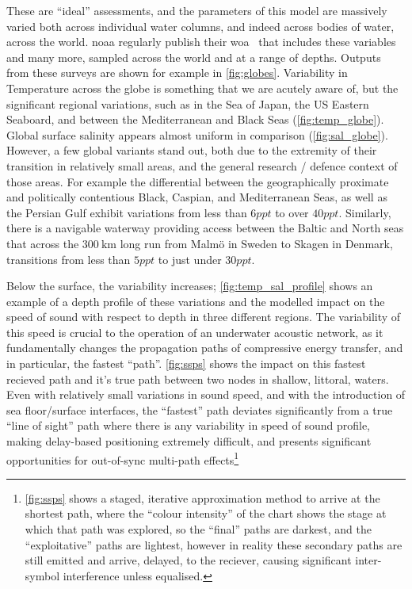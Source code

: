 These are ``ideal'' assessments, and the parameters of this model are massively varied both across individual water columns, and indeed across bodies of water, across the world. 
\gls{noaa} regularly publish their \gls{woa}~\cite{Locarnini2013,Zweng2013} that includes these variables and many more, sampled across the world and at a range of depths. 
Outputs from these surveys are shown for example in \autoref{fig:globes}. 
Variability in Temperature across the globe is something that we are acutely aware of, but the significant regional variations, such as in the Sea of Japan, the US Eastern Seaboard, and between the Mediterranean and Black Seas (\autoref{fig:temp_globe}).
Global surface salinity appears almost uniform in comparison (\autoref{fig:sal_globe}).
However, a few global variants stand out, both due to the extremity of their transition in relatively small areas, and the general research / defence context of those areas. 
For example the differential between the geographically proximate and politically contentious Black, Caspian, and Mediterranean Seas, as well as the Persian Gulf exhibit variations from less than $6ppt$ to over $40ppt$.
Similarly, there is a navigable waterway providing access between the Baltic and North seas that across the $\SI{300}{\kilo\meter}$ long run from Malm{\"o} in Sweden to Skagen in Denmark, transitions from less than $5ppt$ to just under $30ppt$. 

Below the surface, the variability increases; \autoref{fig:temp_sal_profile} shows an example of a depth profile of these variations and the modelled impact on the speed of sound with respect to depth in three different regions. 
The variability of this speed is crucial to the operation of an underwater acoustic network, as it fundamentally changes the propagation paths of compressive energy transfer, and in particular, the fastest ``path''. 
\autoref{fig:ssps} shows the impact on this fastest recieved path and it's true path between two nodes in shallow, littoral, waters.
Even with relatively small variations in sound speed, and with the introduction of sea floor/surface interfaces, the ``fastest'' path deviates significantly from a true ``line of sight'' path where there is any variability in speed of sound profile, making delay-based positioning extremely difficult, and presents significant opportunities for out-of-sync multi-path effects\footnote{\autoref{fig:ssps} shows a staged, iterative approximation method to arrive at the shortest path, where the ``colour intensity'' of the chart shows the stage at which that path was explored, so the ``final'' paths are darkest, and the ``exploitative'' paths are lightest, however in reality these secondary paths are still emitted and arrive, delayed, to the reciever, causing significant inter-symbol interference unless equalised.}



